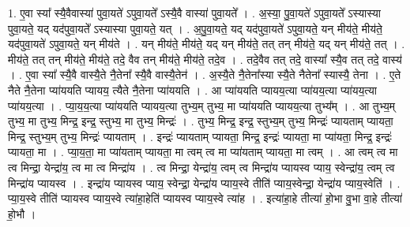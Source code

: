 \documentclass[17pt]{extarticle}
\begin{document}
1. ए॒वा स्या᳚ स्यै॒वैवास्या॑ पुवा॒यते॑ ऽपुवा॒यते᳚ ऽस्यै॒वै वास्या॑ पुवा॒यते᳚ । . अ॒स्या॒ पु॒वा॒यते॑ ऽपुवा॒यते᳚ ऽस्यास्या पुवा॒यते॒ यद् यद॑पुवा॒यते᳚ ऽस्यास्या पुवा॒यते॒ यत् । . अ॒पु॒वा॒यते॒ यद् यद॑पुवा॒यते॑ ऽपुवा॒यते॒ यन् मीय॑ते॒ मीय॑ते॒ यद॑पुवा॒यते॑ ऽपुवा॒यते॒ यन् मीय॑ते । . यन् मीय॑ते॒ मीय॑ते॒ यद् यन् मीय॑ते॒ तत् तन् मीय॑ते॒ यद् यन् मीय॑ते॒ तत् । . मीय॑ते॒ तत् तन् मीय॑ते॒ मीय॑ते॒ तदे॒ वैव तन् मीय॑ते॒ मीय॑ते॒ तदे॒व । . तदे॒वैव तत् तदे॒ वास्या᳚ स्यै॒व तत् तदे॒ वास्य॑ । . ए॒वा स्या᳚ स्यै॒वै वास्यै॒ते नै॒तेना᳚ स्यै॒वै वास्यै॒तेन॑ । . अ॒स्यै॒ते नै॒तेना᳚स्या स्यै॒ते नैतेना᳚ स्यास्यै॒ तेना । . ए॒ते नैते नै॒तेना प्या॑ययति प्यायय॒ त्यैते नै॒तेना प्या॑ययति । . आ प्या॑ययति प्यायय॒त्या प्या॑यय॒त्या प्या॑यय॒त्या प्या॑यय॒त्या । . प्या॒य॒य॒त्या प्या॑ययति प्यायय॒त्या तुभ्य॒म् तुभ्य॒ मा प्या॑ययति प्यायय॒त्या तुभ्य᳚म् । . आ तुभ्य॒म् तुभ्य॒ मा तुभ्य॒ मिन्द्र॒ इन्द्र॒ स्तुभ्य॒ मा तुभ्य॒ मिन्द्रः॑ । . तुभ्य॒ मिन्द्र॒ इन्द्र॒ स्तुभ्य॒म् तुभ्य॒ मिन्द्रः॑ प्यायताम् प्यायता॒ मिन्द्र॒ स्तुभ्य॒म् तुभ्य॒ मिन्द्रः॑ प्यायताम् । . इन्द्रः॑ प्यायताम् प्यायता॒ मिन्द्र॒ इन्द्रः॑ प्यायता॒ मा प्या॑यता॒ मिन्द्र॒ इन्द्रः॑ प्यायता॒ मा । . प्या॒य॒ता॒ मा प्या॑यताम् प्यायता॒ मा त्वम् त्व मा प्या॑यताम् प्यायता॒ मा त्वम् । . आ त्वम् त्व मा त्व मिन्द्रा॒ येन्द्रा॑य॒ त्व मा त्व मिन्द्रा॑य । . त्व मिन्द्रा॒ येन्द्रा॑य॒ त्वम् त्व मिन्द्रा॑य प्यायस्व प्याय॒ स्वेन्द्रा॑य॒ त्वम् त्व मिन्द्रा॑य प्यायस्व । . इन्द्रा॑य प्यायस्व प्याय॒ स्वेन्द्रा॒ येन्द्रा॑य प्याय॒स्वे तीति॑ प्याय॒स्वेन्द्रा॒ येन्द्रा॑य प्याय॒स्वेति॑ । . प्या॒य॒स्वे तीति॑ प्यायस्व प्याय॒स्वे त्या॑हा॒हेति॑ प्यायस्व प्याय॒स्वे त्या॑ह । . इत्या॑हा॒हे तीत्या॑ हो॒भा वु॒भा वा॒हे तीत्या॑ हो॒भौ । \newline
\end{document}
